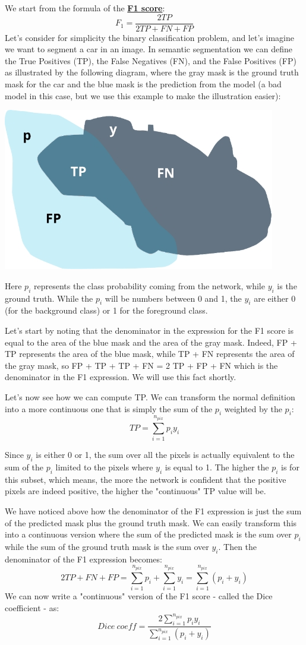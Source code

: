 We start from the formula of the \href{https://en.wikipedia.org/wiki/F-score}{\textbf{F1 score}}: \[F_1 = \frac{2TP}{2TP + FN + FP}\]
Let's consider for simplicity the binary classification problem, and let's imagine we want to segment a car in an image. In semantic segmentation we can define the True Positives (TP), the False Negatives (FN), and the False Positives (FP) as illustrated by the following diagram, where the gray mask is the ground truth mask for the car and the blue mask is the prediction from the model (a bad model in this case, but we use this example to make the illustration easier):

\includegraphics[width=0.25\linewidth]{img//cnn//object/segmentation-tp-fn-fp.jpeg}
    
Here \(p_i\) represents the class probability coming from the network, while \(y_i\) is the ground truth. While the \(p_i\) will be numbers between 0 and 1, the \(y_i\) are either 0 (for the background class) or 1 for the foreground class. \newline

Let's start by noting that the denominator in the expression for the F1 score is equal to the area of the blue mask and the area of the gray mask. Indeed, FP + TP represents the area of the blue mask, while TP + FN represents the area of the gray mask, so FP + TP + TP + FN = 2 TP + FP + FN which is the denominator in the F1 expression. We will use this fact shortly. \newline

Let's now see how we can compute TP. We can transform the normal definition into a more continuous one that is simply the sum of the \(p_i\) weighted by the \(p_i\): \[TP = \sum_{i=1}^{n_{pix}} p_i y_i\]

Since \(y_i\) is either 0 or 1, the sum over all the pixels is actually equivalent to the sum of the \(p_i\) limited to the pixels where \(y_i\) is equal to 1. The higher the \(p_i\) is for this subset, which means, the more the network is confident that the positive pixels are indeed positive, the higher the "continuous" TP value will be. \newline

We have noticed above how the denominator of the F1 expression is just the sum of the predicted mask plus the ground truth mask. We can easily transform this into a continuous version where the sum of the predicted mask is the sum over \(p_i\) while the sum of the ground truth mask is the sum over \(y_i\). Then the denominator of the F1 expression becomes: \[2TP + FN + FP = \sum_{i=1}^{n_{pix}}p_i +\sum_{i=1}^{n_{pix}}y_i = \sum_{i=1}^{n_{pix}} (p_i + y_i)\]
We can now write a "continuous" version of the F1 score - called the Dice coefficient - as: \[Dice\ coeff = \frac{2\sum_{i=1}^{n_{pix}} p_i y_i}{\sum_{i=1}^{n_{pix}} (p_i + y_i)}\]

